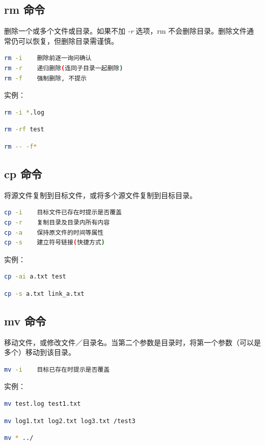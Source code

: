 \documentclass[12pt,a4paper]{ctexbook}
\begin{document}
\subsection{rm 命令}
删除一个或多个文件或目录。如果不加 \textit{-r} 选项，rm 不会删除目录。删除文件通常仍可以恢复，但删除目录需谨慎。
\begin{lstlisting}[language=bash,title={rm 常用参数}]
rm -i    删除前逐一询问确认
rm -r    递归删除(连同子目录一起删除)
rm -f    强制删除, 不提示
\end{lstlisting}
实例：
\begin{lstlisting}[language=bash,title={删除任何 .log 文件, 删除前逐一询问}]
    rm -i *.log
\end{lstlisting}
\begin{lstlisting}[language=bash,title={删除 test 子目录及其中所有内容, 不一一确认}]
    rm -rf test
\end{lstlisting}
\begin{lstlisting}[language=bash,title={删除以 - 开头的文件(用 -- 结束选项) }]
    rm -- -f*
\end{lstlisting}

\subsection{cp 命令}
将源文件复制到目标文件，或将多个源文件复制到目标目录。
\begin{lstlisting}[language=bash,title={cp 常用参数}]
cp -i    目标文件已存在时提示是否覆盖
cp -r    复制目录及目录内所有内容
cp -a    保持原文件的时间等属性
cp -s    建立符号链接(快捷方式)
\end{lstlisting}
实例：
\begin{lstlisting}[language=bash,title={复制 a.txt 到 test 目录, 保持时间, 存在则提示}]
    cp -ai a.txt test
\end{lstlisting}
\begin{lstlisting}[language=bash,title={为 a.txt 建立一个链接(快捷方式)}]
    cp -s a.txt link_a.txt
\end{lstlisting}

\subsection{mv 命令}
移动文件，或修改文件／目录名。当第二个参数是目录时，将第一个参数（可以是多个）移动到该目录。
\begin{lstlisting}[language=bash,title={mv 常用参数}]
mv -i    目标已存在时提示是否覆盖
\end{lstlisting}
实例：
\begin{lstlisting}[language=bash,title={将文件 test.log 改名为 test1.txt}]
    mv test.log test1.txt
\end{lstlisting}
\begin{lstlisting}[language=bash,title={把多个文件移动到根的 test3 目录}]
    mv log1.txt log2.txt log3.txt /test3
\end{lstlisting}
\begin{lstlisting}[language=bash,title={移动当前目录下所有文件到上一级目录}]
    mv * ../
\end{lstlisting}
\end{document}
